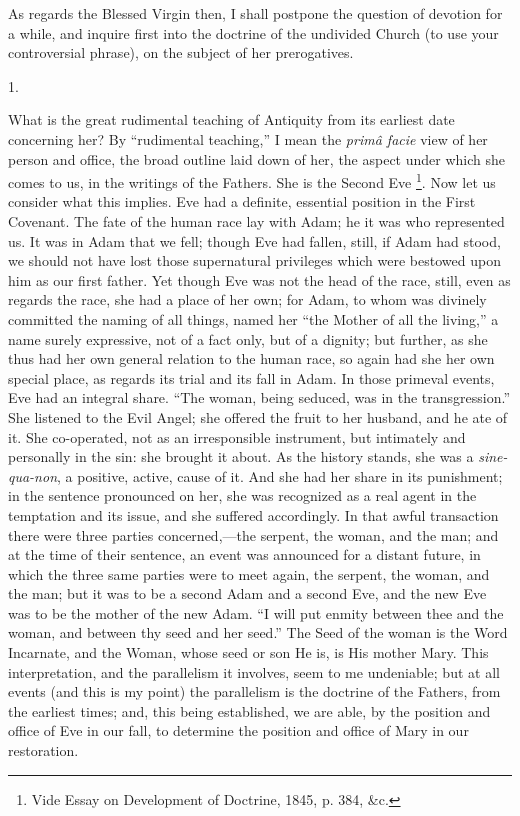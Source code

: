 As regards the Blessed Virgin then, I shall postpone the question of
devotion for a while, and inquire first into the doctrine of the
undivided Church (to use your controversial phrase), on the subject of
her prerogatives.

1.

What is the great rudimental teaching of Antiquity from its earliest
date concerning her? By ``rudimental teaching,'' I mean the \emph{primâ
facie} view of her person and office, the broad outline laid down of
her, the aspect under which she comes to us, in the writings of the
Fathers. She is the Second Eve \footnote{Vide Essay on Development of
Doctrine, 1845, p. 384,
\&c.}.
Now let us consider what this implies. Eve had a definite, essential
position in the First Covenant. The fate of the human race lay with
Adam; he it was who represented us. It was in Adam that we fell; though
Eve had fallen, still, if Adam had stood, we should not have lost those
supernatural privileges which were bestowed upon him as our first
father. Yet though Eve was not the head of the race, still, even as
regards the race, she had a place of her own; for Adam, to whom was
divinely committed the naming of all things, named her ``the Mother
of all the living,'' a name surely expressive, not of a fact only,
but of a dignity; but further, as she thus had her own general relation
to the human race, so again had she her own special place, as
regards its trial and its fall in Adam. In those primeval events, Eve
had an integral share. ``The woman, being seduced, was in the
transgression.'' She listened to the Evil Angel; she offered the
fruit to her husband, and he ate of it. She co-operated, not as an
irresponsible instrument, but intimately and personally in the sin: she
brought it about. As the history stands, she was a \emph{sine-qua-non},
a positive, active, cause of it. And she had her share in its
punishment; in the sentence pronounced on her, she was recognized as a
real agent in the temptation and its issue, and she suffered
accordingly. In that awful transaction there were three parties
concerned,—the serpent, the woman, and the man; and at the time of
their sentence, an event was announced for a distant future, in which
the three same parties were to meet again, the serpent, the woman, and
the man; but it was to be a second Adam and a second Eve, and the new
Eve was to be the mother of the new Adam. ``I will put enmity
between thee and the woman, and between thy seed and her seed.'' The
Seed of the woman is the Word Incarnate, and the Woman, whose seed or
son He is, is His mother Mary. This interpretation, and the parallelism
it involves, seem to me undeniable; but at all events (and this is my
point) the parallelism is the doctrine of the Fathers, from the earliest
times; and, this being established, we are able, by the position and
office of Eve in our fall, to determine the position and office of Mary
in our restoration.

